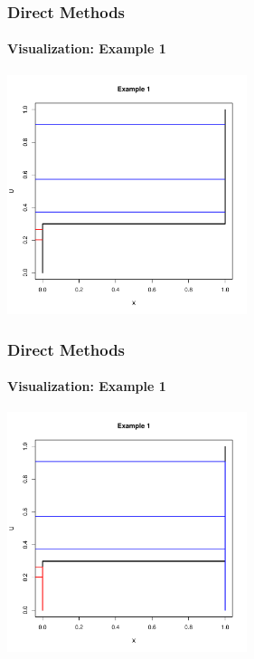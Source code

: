 \documentclass[10pt]{beamer}
\begin{document}
              \begin{frame}
                \frametitle{Direct Methods}
                \framesubtitle{Visualization: Example 1}
                \begin{center}
                  \includegraphics[height=7cm]{./Pics/d1p2.pdf}
                \end{center}
              \end{frame}

              \begin{frame}
                \frametitle{Direct Methods}
                \framesubtitle{Visualization: Example 1}
                \begin{center}
                  \includegraphics[height=7cm]{./Pics/d1p3.pdf}
                \end{center}
              \end{frame}
\end{document}
